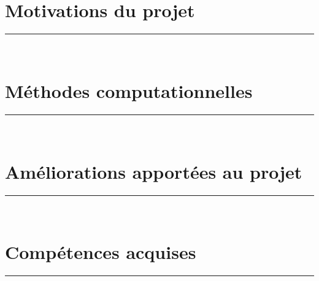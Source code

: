 \setcounter{myfigure}{1}
\renewcommand{\caption}[1]{
  \vspace{0.5cm}
  \begin{quote}
    {{\sc Figure} \arabic{myfigure}: #1}
  \end{quote}
  \vspace{1cm}
  \stepcounter{myfigure}
}%
%

%
\renewcommand{\titlesize}{\Huge}%
\title{\Title}


\author{
{\FirstNameA\ \AuthorA\ } 
{\FirstNameB\ \AuthorB\ }
}

\institute{
{\InstituteA }
{\InstituteB }
}           

\conference{\Conference}
 
\maketitle

\begin{multicols}{3}

\section*{Motivations du projet}
\rule[40ex]{\linewidth}{3pt}\\
\ParagMotiv
\columnbreak

\section*{Méthodes computationnelles}
\rule[40ex]{\linewidth}{3pt}\\
\ParagMethComp
\columnbreak

\section*{Améliorations apportées au projet}
\rule[40ex]{\linewidth}{3pt}\\
\ParagAmelio

\section*{Compétences acquises}
\rule[40ex]{\linewidth}{3pt}\\
\ParagCompAcqu

\end{multicols}

